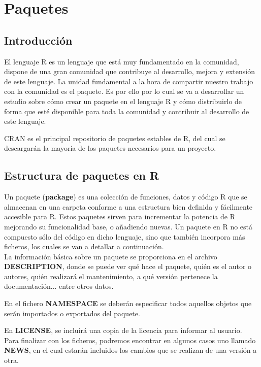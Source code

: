 \section{Paquetes}
\subsection{Introducci\'on}


El lenguaje R es un lenguaje que est\'a muy fundamentado en la comunidad, dispone de una gran comunidad que 
contribuye al desarrollo, mejora y extensi\'on de este lenguaje. La unidad fundamental a la hora de compartir 
nuestro trabajo con la comunidad es el paquete. Es por ello por lo cual se va a desarrollar un estudio sobre 
c\'omo crear un paquete en el lenguaje R y c\'omo distribuirlo de forma que est\'e disponible para toda la 
comunidad y contribuir al desarrollo de este lenguaje.

CRAN es el principal repositorio de paquetes estables de R, del cual se descargar\'an la mayor\'ia de los paquetes necesarios para un proyecto.


\subsection{Estructura de paquetes en R}

Un paquete (\textbf{package}) es una colecci\'on de funciones, datos y c\'odigo R que se almacenan en una carpeta 
conforme a una estructura bien definida y f\'acilmente accesible para R.
Estos paquetes sirven para incrementar la potencia de R mejorando su funcionalidad base, o a\~nadiendo 
nuevas.
Un paquete en R no est\'a compuesto s\'olo del c\'odigo en dicho lenguaje, sino que tambi\'en incorpora m\'as ficheros, 
los cuales se van a detallar a continuaci\'on.\\

La informaci\'on b\'asica sobre un paquete se proporciona en el archivo \textbf{DESCRIPTION}, donde se puede ver qu\'e hace 
el paquete, qui\'en es el autor o autores, qui\'en realizar\'a el mantenimiento, a qu\'e versi\'on pertenece la documentaci\'on... entre otros datos.

En el fichero \textbf{NAMESPACE} se deber\'an especificar todos aquellos objetos que ser\'an importados o exportados del paquete.

En \textbf{LICENSE}, se incluir\'a una copia de la licencia para informar al usuario.\\

Para finalizar con los ficheros, podremos encontrar en algunos casos uno llamado \textbf{NEWS}, en el cual estar\'an 
incluidos los cambios que se realizan de una versi\'on a otra.
\\

